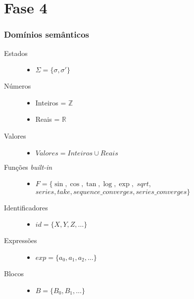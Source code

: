\documentclass{beamer}
\begin{document}
\section{Fase 4}
\begin{frame}[fragile]
\frametitle{Dom\'inios sem\^anticos}
\begin{description}
\item[Estados]\hfill
  \begin{itemize}
  \item $\Sigma = \{\sigma, \sigma '\}$
  \end{itemize}
\item[N\'umeros]\hfill
  \begin{itemize}
  \item Inteiros = $\mathbb{Z}$
  \item Reais = $\mathbb{R}$
  \end{itemize}
\item[Valores]\hfill
  \begin{itemize}
  \item $Valores = Inteiros \cup Reais$
  \end{itemize}
\item[Fun\c c\~oes \emph{built-in}]\hfill
  \begin{itemize}
  \item $F = \{\sin, \cos, \tan, \log, \exp,$ $sqrt$, \\$series, take, sequence\_converges, series\_converges\}$
  \end{itemize}
\item[Identificadores]\hfill
  \begin{itemize}
  \item $id = \{X, Y, Z, \ldots\}$
  \end{itemize}
\item[Express\~oes]\hfill
  \begin{itemize}
  \item $exp = \{a_0, a_1, a_2, \ldots\}$
  \end{itemize}
\item[Blocos]\hfill
  \begin{itemize}
  \item $B = \{B_0, B_1, \ldots \}$
  \end{itemize}
\end{description}
\end{frame}
\end{document}
